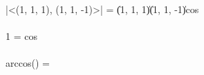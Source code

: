 |<(1, 1, 1), (1, 1, -1)>| = \|(1, 1, 1)\| \cdot \|(1, 1, -1)\| \cdot cos \theta \\
\leftrightarrow \\
1 =  \cdot {} \cdot cos\theta\\
\leftrightarrow \\
arccos\left(\right) = \theta